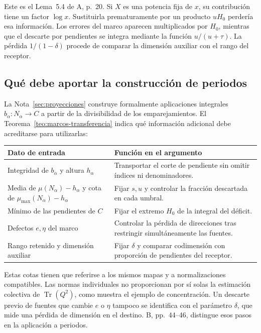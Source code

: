 Este es el Lema~5.4 de A, p.~20. Si $X$ es una potencia fija de
$x$, su contribución tiene un factor $\log x$. Sustituirla
prematuramente por un producto $uH_0$ perdería esa información.
Los errores del marco aparecen multiplicados por $H_0$, mientras
que el descarte por pendientes se integra mediante la función
$u/(u+\tau)$. La pérdida $1/(1-\delta)$ procede de comparar
la dimensión auxiliar con el rango del receptor.

\subsection{Qué debe aportar la construcción de periodos}

La Nota~\ref{sec:proyecciones} construye formalmente aplicaciones
integrales $b_\alpha:N_\alpha\to C$ a partir de la divisibilidad
de los emparejamientos. El Teorema~\ref{teo:marcos-transferencia}
indica qué información adicional debe acreditarse para utilizarlas:

\begin{center}
\small
\begin{tabularx}{\textwidth}{@{}>{\raggedright\arraybackslash}p{}Y@{}}
\toprule
Dato de entrada & Función en el argumento \\
\midrule
Integridad de $b_\alpha$ y altura $h_\alpha$ &
Transportar el corte de pendiente sin omitir índices ni denominadores. \\
Media de $\mu(N_\alpha)-h_\alpha$ y cota de $\mu_{\max}(N_\alpha)-h_\alpha$ &
Fijar $s,u$ y controlar la fracción descartada en cada umbral. \\
Mínimo de las pendientes de $C$ &
Fijar el extremo $H_0$ de la integral del déficit. \\
Defectos $e,\eta$ del marco &
Controlar la pérdida de direcciones tras restringir simultáneamente las fuentes. \\
Rango retenido y dimensión auxiliar &
Fijar $\delta$ y comparar codimensión con proporción de pendientes del receptor. \\
\bottomrule
\end{tabularx}
\end{center}

Estas cotas tienen que referirse a los mismos mapas y a normalizaciones
compatibles. Las normas individuales no proporcionan por sí solas
la estimación colectiva de $\operatorname{Tr}(Q^2)$, como muestra
el ejemplo de concentración. Un descarte previo de fuentes que cambie
$e$ o $\eta$ tampoco se identifica con el parámetro $\delta$, que
mide una pérdida de dimensión en el destino. B, pp.~44--46, distingue
esos pasos en la aplicación a periodos.

